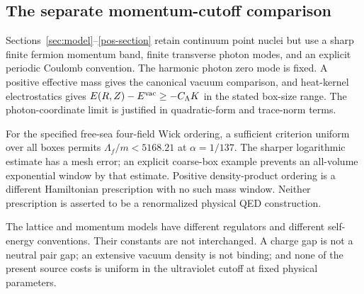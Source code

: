 \subsection{The separate momentum-cutoff comparison}

Sections~\ref{sec:model}--\ref{pos-section} retain continuum point
nuclei but use a sharp finite fermion momentum band, finite transverse
photon modes, and an explicit periodic Coulomb convention.
The harmonic photon zero mode is fixed. A positive effective mass
gives the canonical vacuum comparison, and heat-kernel electrostatics
gives $E(R,Z)-E^{\mathrm{vac}}\ge-C_\Lambda K$ in the stated box-size range.
The photon-coordinate limit is justified in quadratic-form and
trace-norm terms.

For the specified free-sea four-field Wick ordering, a sufficient
criterion uniform over all boxes permits $\Lambda_f/m<5168.21$ at
$\alpha=1/137$. The sharper logarithmic estimate has a mesh error;
an explicit coarse-box example prevents an all-volume exponential
window by that estimate. Positive density-product ordering is a
different Hamiltonian prescription with no such mass window.
Neither prescription is asserted to be a renormalized physical
QED construction.

The lattice and momentum models have different regulators and
different self-energy conventions. Their constants are not
interchanged. A charge gap is not a neutral pair gap; an extensive
vacuum density is not binding; and none of the present source costs
is uniform in the ultraviolet cutoff at fixed physical parameters.
